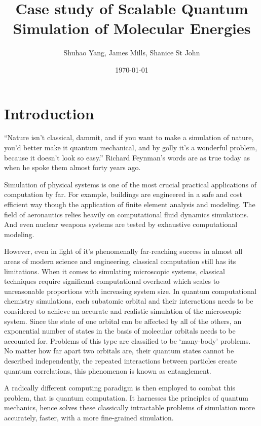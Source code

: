 \documentclass[12pt]{article}
\begin{document}
\title{Case study of Scalable Quantum Simulation of Molecular Energies}
\author{Shuhao Yang, James Mills, Shanice St John}
\date{\today}
\maketitle
\section{Introduction}
“Nature isn't classical, dammit, and if you want to make a simulation of nature, you'd better make it quantum mechanical, and by golly it's a wonderful
 problem, because it doesn't look so easy.” Richard Feynman’s words are as true today as when he spoke them almost forty years ago.

Simulation of physical systems is one of the most crucial practical applications of computation by far.  For example, buildings are engineered in a safe
and cost efficient way though the application of ﬁnite element analysis and modeling. The field of aeronautics relies heavily on computational ﬂuid
dynamics simulations. And even nuclear weapons systems are tested by exhaustive computational modeling.

However, even in light of it's phenomenally far-reaching success in almost all areas of modern science and engineering, classical computation still
has its limitations. When it comes to simulating microscopic systems, classical techniques require significant computational overhead which scales to
unreasonable proportions with increasing system size. In quantum computational chemistry simulations, each subatomic orbital and their interactions
needs to be considered to achieve an accurate and realistic simulation of the microscopic system. Since the state of one orbital can be affected by
all of the others, an exponential number of states in the basis of molecular orbitals needs to be accounted for. Problems of this type are classified
to be ‘many-body’ problems. No matter how far apart two orbitals are, their quantum states cannot be described independently, the repeated interactions between particles create
quantum correlations, this phenomenon is known as entanglement.

A radically different computing paradigm is then employed to combat this problem, that is quantum computation. It harnesses the principles of quantum
mechanics, hence solves these classically intractable problems of simulation more accurately, faster, with a more fine-grained simulation.
\end{document}
